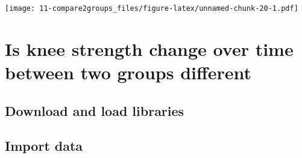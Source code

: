 \documentclass[
]{book}
\newenvironment{Shaded}{\begin{snugshade}}{\end{snugshade}}
\newcommand{\CommentTok}[1]{\textcolor[rgb]{0.56,0.35,0.01}{\textit{#1}}}
\newcommand{\ControlFlowTok}[1]{\textcolor[rgb]{0.13,0.29,0.53}{\textbf{#1}}}
\newcommand{\KeywordTok}[1]{\textcolor[rgb]{0.13,0.29,0.53}{\textbf{#1}}}
\newcommand{\NormalTok}[1]{#1}
\newcommand{\OperatorTok}[1]{\textcolor[rgb]{0.81,0.36,0.00}{\textbf{#1}}}
\newcommand{\StringTok}[1]{\textcolor[rgb]{0.31,0.60,0.02}{#1}}
\begin{document}
\texttt{[image: 11-compare2groups\_files/figure-latex/unnamed-chunk-20-1.pdf]}

\hypertarget{is-knee-strength-change-over-time-between-two-groups-different}{%
\chapter{Is knee strength change over time between two groups different}\label{is-knee-strength-change-over-time-between-two-groups-different}}

\hypertarget{download-and-load-libraries}{%
\section*{Download and load libraries}\label{download-and-load-libraries}}

\begin{Shaded}
\end{Shaded}

\hypertarget{import-data}{%
\section*{Import data}\label{import-data}}
\end{document}
